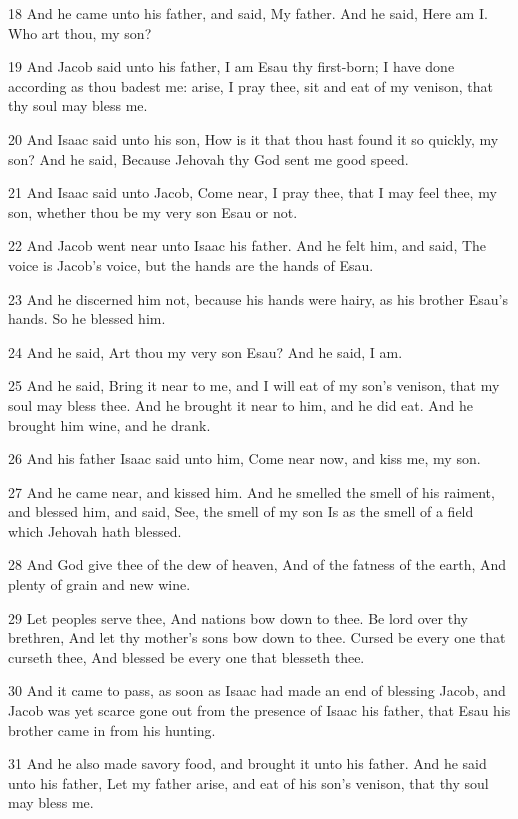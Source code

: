 \par 18 And he came unto his father, and said, My father. And he said, Here am I. Who art thou, my son?
\par 19 And Jacob said unto his father, I am Esau thy first-born; I have done according as thou badest me: arise, I pray thee, sit and eat of my venison, that thy soul may bless me.
\par 20 And Isaac said unto his son, How is it that thou hast found it so quickly, my son? And he said, Because Jehovah thy God sent me good speed.
\par 21 And Isaac said unto Jacob, Come near, I pray thee, that I may feel thee, my son, whether thou be my very son Esau or not.
\par 22 And Jacob went near unto Isaac his father. And he felt him, and said, The voice is Jacob's voice, but the hands are the hands of Esau.
\par 23 And he discerned him not, because his hands were hairy, as his brother Esau's hands. So he blessed him.
\par 24 And he said, Art thou my very son Esau? And he said, I am.
\par 25 And he said, Bring it near to me, and I will eat of my son's venison, that my soul may bless thee. And he brought it near to him, and he did eat. And he brought him wine, and he drank.
\par 26 And his father Isaac said unto him, Come near now, and kiss me, my son.
\par 27 And he came near, and kissed him. And he smelled the smell of his raiment, and blessed him, and said, See, the smell of my son Is as the smell of a field which Jehovah hath blessed.
\par 28 And God give thee of the dew of heaven, And of the fatness of the earth, And plenty of grain and new wine.
\par 29 Let peoples serve thee, And nations bow down to thee. Be lord over thy brethren, And let thy mother's sons bow down to thee. Cursed be every one that curseth thee, And blessed be every one that blesseth thee.
\par 30 And it came to pass, as soon as Isaac had made an end of blessing Jacob, and Jacob was yet scarce gone out from the presence of Isaac his father, that Esau his brother came in from his hunting.
\par 31 And he also made savory food, and brought it unto his father. And he said unto his father, Let my father arise, and eat of his son's venison, that thy soul may bless me.
